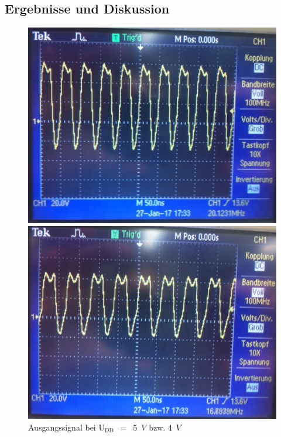 \subsection{Ergebnisse und Diskussion}
\begin{figure}[!h]
\begin{minipage}[t]{0.5\textwidth}
\includegraphics[width=\textwidth]{bild/Inverter5V}
\end{minipage}
\hfill
\begin{minipage}[t]{0.5\textwidth}
\includegraphics[width=\textwidth]{bild/Inverter4V}
\end{minipage}
\caption{Ausgangssignal bei U$_{\text{DD}}$~$=$~5~$V$ bzw. 4~$V$}
\end{figure}
